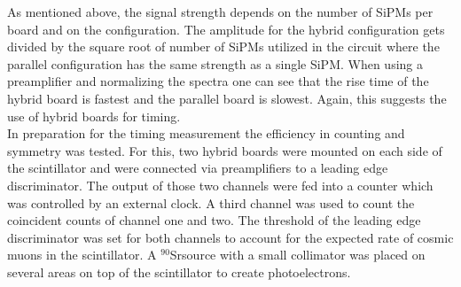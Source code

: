 \documentclass[12pt]{article}
\newcommand{\sr}{$^{90}$Sr}
\begin{document}
As mentioned above, the signal strength depends on the number of SiPMs per board and on the configuration. The amplitude for the hybrid configuration gets divided by the square root of number of SiPMs utilized in the circuit where the parallel configuration has the same strength as a single SiPM. When using a preamplifier and normalizing the spectra one can see that the rise time of the hybrid board is fastest and the parallel board is slowest. Again, this suggests the use of hybrid boards for timing. \\ \indent
In preparation for the timing measurement the efficiency in counting and symmetry was tested. For this, two hybrid boards were mounted on each side of the scintillator and were connected via preamplifiers to a leading edge discriminator. The output of those two channels were fed into a counter which was controlled by an external clock. A third channel was used to count the coincident counts of channel one and two. The threshold of the leading edge discriminator was set for both channels to account for the expected rate of cosmic muons in the scintillator. A \sr source with a small collimator was placed on several areas on top of the scintillator to create photoelectrons. \\ \indent
\end{document}
